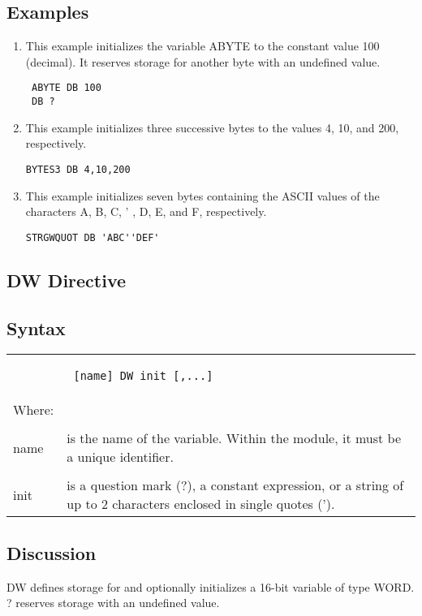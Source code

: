 \subsection*{Examples}
\begin{enumerate}
\item This example initializes the variable ABYTE to the constant value 100 (decimal). It reserves storage for another byte with an undefined value.
\begin{verbatim}
 ABYTE DB 100
 DB ?
\end{verbatim}
\item This example initializes three successive bytes to the values 4, 10, and 200, respectively.
\begin{verbatim}
BYTES3 DB 4,10,200
\end{verbatim}
\item This example initializes seven bytes containing the ASCII values of the characters A, B, C, ' , D, E, and F, respectively.
\begin{verbatim}
STRGWQUOT DB 'ABC''DEF'
\end{verbatim}
\end{enumerate}
\subsection*{DW Directive} 
\subsection*{Syntax}

\begin{tabular}{p{2cm} p{12.5cm}}
& \begin{verbatim} [name] DW init [,...] \end{verbatim} \\
Where: & \\
& \\
name & is the name of the variable. Within the module, it must be a unique identifier. \\
& \\
init & is a question mark (?), a constant expression, or a string of up to 2 characters enclosed in single quotes (').\\
\end{tabular}
\subsection*{Discussion}
DW defines storage for and optionally initializes a 16-bit variable of type WORD. ? reserves storage with an undefined value.

